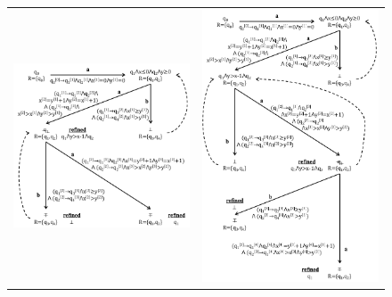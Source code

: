\documentclass[10pt,conference,letterpaper,twocolumn]{IEEEtran}
\begin{document}
\begin{figure}[t!]
\begin{tabular}{cc}
\includegraphics[scale=0.42]{figures/IM3.pdf} & \includegraphics[scale=0.42]{figures/IM4.pdf} \\

\end{tabular}
\end{figure}
\end{document}
